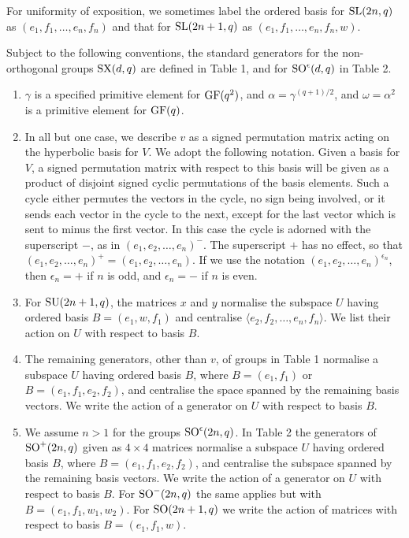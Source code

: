 \documentclass[12pt]{article}
\def\SL{{\rm SL}}
\def\SO{{\rm SO}}
\def\GF{{\rm GF}}
\def\SU{{\rm SU}}
\def\SX{{\rm SX}}
\begin{document}
For uniformity of exposition, we sometimes
label the ordered basis for 
$\SL(2n, q)$ as $(e_1,f_1,\ldots,e_n,f_n)$
and that for $\SL(2n + 1, q)$ 
as $(e_1,f_1,\ldots,e_n,f_n, w)$.

Subject to the following conventions,
the standard generators for the non-orthogonal
groups $\SX(d, q)$ are defined in Table 1, 
and for $\SO^\epsilon(d,q)$ in Table 2. 

\begin{enumerate}
\item 
$\gamma$ is a specified primitive element for $\GF(q^2)$,
and $\alpha = \gamma^{(q + 1)/2}$, and
$\omega=\alpha^2$ is a primitive element for $\GF(q)$.

\item In all  but one case,  we  describe $v$ as a  signed permutation
  matrix acting on the  hyperbolic  basis for  $V$. We  adopt  the
  following notation.  Given a basis for $V$, a signed permutation
  matrix with respect  to this  basis will be  given as  a product  of
  disjoint signed cyclic  permutations of the  basis elements.  Such a
  cycle  either  permutes the  vectors in  the  cycle,  no sign  being
  involved, or it  sends each vector in  the cycle to the next, except
  for the  last vector which  is sent to minus the first vector.  In
  this  case the  cycle is adorned with the superscript $-$, as in
  $(e_1,e_2,\ldots,e_n)^-$.  The superscript $+$ has no effect,
  so that $(e_1,e_2,\ldots,e_n)^+=(e_1,e_2,\ldots,e_n)$. 
  If we use the notation $(e_1,e_2,\ldots,e_n)^{\epsilon_n}$, then 
  $\epsilon_n=+$ if $n$ is odd, and $\epsilon_n=-$ if $n$ is even. 

\item For $\SU(2n+1, q)$, the matrices $x$ and $y$
normalise the subspace $U$ having ordered basis $B = (e_1,w,f_1)$ and
centralise $\langle e_2, f_2, \ldots, e_{n}, f_{n}\rangle$.
We list their action on $U$ with respect to basis $B$.

\item The remaining generators, other than $v$,  
of groups in Table 1 normalise a subspace $U$
having ordered basis $B$, where $B=(e_1, f_1)$ or 
$B=(e_1, f_1, e_2, f_2)$, and centralise the 
space spanned by the remaining basis
vectors.  We write the action of a generator on $U$ with respect to
basis $B$.

\item
We assume $n>1$ for the groups $\SO^\epsilon(2n,q)$. 
In Table 2 the generators of $\SO^+(2n,q)$ 
given as $4\times4$ matrices normalise a subspace $U$ having ordered basis $B$,
where $B=(e_1,f_1,e_2,f_2)$, and centralise the subspace spanned by the 
remaining basis vectors.
We write the action of a generator on $U$ with respect to basis $B$. 
For $\SO^-(2n,q)$ the same applies but with 
$B=(e_1,f_1,w_1,w_2)$. 
For $\SO(2n+1,q)$ we write the action
of matrices with respect to basis $B=(e_1,f_1,w)$. 


\end{enumerate}
\end{document}

